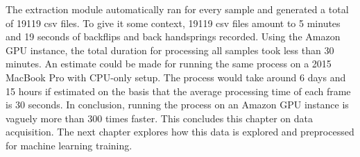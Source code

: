 The extraction module automatically ran for every sample and generated a total of 19119 csv files. To give it some context, 19119 csv files amount to 5 minutes and 19 seconds of backflips and back handsprings recorded. Using the Amazon GPU instance, the total duration for processing all samples took less than 30 minutes. An estimate could be made for running the same process on a 2015 MacBook Pro with CPU-only setup. The process would take around 6 days and 15 hours if estimated on the basis that the average processing time of each frame is 30 seconds. In conclusion, running the process on an Amazon GPU instance is vaguely more than 300 times faster. This concludes this chapter on data acquisition. The next chapter explores how this data is explored and preprocessed for machine learning training.




















